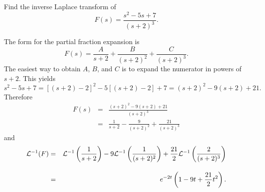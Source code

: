 \setcounter{example}{6}
\begin{example}
  \label{example:8.2.7}\rm Find the inverse Laplace transform of
  \[
    F(s)=\frac{s^{2}-5s+7}{(s+2)^{3}}.
  \]
\end{example}
\begin{examplesolution}
\solution The form for the partial fraction expansion is
\[
  F(s)=\frac{A}{s+2}+\frac{B}{(s+2)^{2}}+\frac{C}{(s+2)^{3}}.
\]
The easiest way to obtain $A$, $B$, and $C$ is to expand the numerator in powers of $s+2$. This
yields
\[
  s^{2}-5s+7=[(s+2)-2]^{2}-5[(s+2)-2]+7=(s+2)^{2}-9(s+2)+21.
\]
Therefore
\begin{eqnarray*}
  F(s) & = & \frac{(s+2)^{2}-9(s+2)+21}{(s+2)^{3}} \\[10pt]
       & = & \frac{1}{s+2}-\frac{9}{(s+2)^{2}}+\frac{21}{(s+2)^{3}}
\end{eqnarray*}
and
\begin{eqnarray*}
  {\cal L}^{-1}(F) & = & {\cal L}^{-1}\left(\frac{1}{s+2}\right)-9{\cal L}^{-1}\left(\frac{1}{(s+2)^{2}}\right)+\frac{21}{2}{\cal L}^{-1}\left(\frac{2}{(s+2)^{3}}\right) \\[10pt]
                   & = & e^{-2t}\left(1-9t+\frac{21}{2}t^{2}\right).
\end{eqnarray*}
\end{examplesolution}

